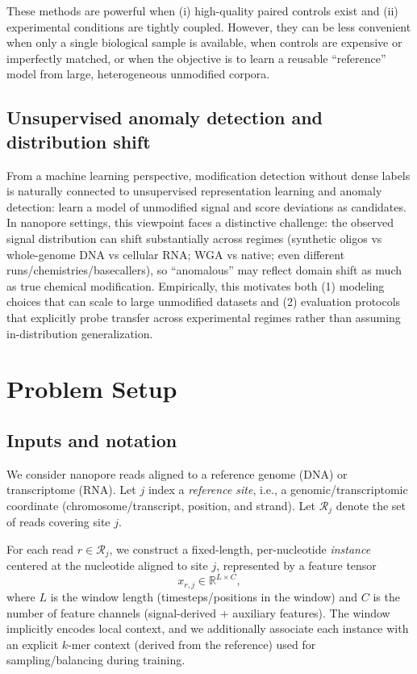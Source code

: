 \documentclass[sigconf, review]{acmart}
\begin{document}
These methods are powerful when (i) high-quality paired controls exist and (ii) experimental conditions are tightly coupled. However, they can be less convenient when only a single biological sample is available, when controls are expensive or imperfectly matched, or when the objective is to learn a reusable “reference” model from large, heterogeneous unmodified corpora.

\subsection{Unsupervised anomaly detection and distribution shift}
From a machine learning perspective, modification detection without dense labels is naturally connected to unsupervised representation learning and anomaly detection: learn a model of unmodified signal and score deviations as candidates. In nanopore settings, this viewpoint faces a distinctive challenge: the observed signal distribution can shift substantially across regimes (synthetic oligos vs whole-genome DNA vs cellular RNA; WGA vs native; even different runs/chemistries/basecallers), so “anomalous” may reflect domain shift as much as true chemical modification. Empirically, this motivates both (1) modeling choices that can scale to large unmodified datasets and (2) evaluation protocols that explicitly probe transfer across experimental regimes rather than assuming in-distribution generalization.

\section{Problem Setup}
\subsection{Inputs and notation}
We consider nanopore reads aligned to a reference genome (DNA) or transcriptome (RNA). Let $j$
index a \emph{reference site}, i.e., a genomic/transcriptomic coordinate (chromosome/transcript,
position, and strand). Let $\mathcal{R}_j$ denote the set of reads covering site $j$.

For each read $r \in \mathcal{R}_j$, we construct a fixed-length, per-nucleotide \emph{instance}
centered at the nucleotide aligned to site $j$, represented by a feature tensor
\begin{equation}
x_{r,j} \in \mathbb{R}^{L \times C},
\end{equation}
where $L$ is the window length (timesteps/positions in the window) and $C$ is the number of
feature channels (signal-derived + auxiliary features). The window implicitly encodes local context,
and we additionally associate each instance with an explicit $k$-mer context (derived from the
reference) used for sampling/balancing during training.
\end{document}
